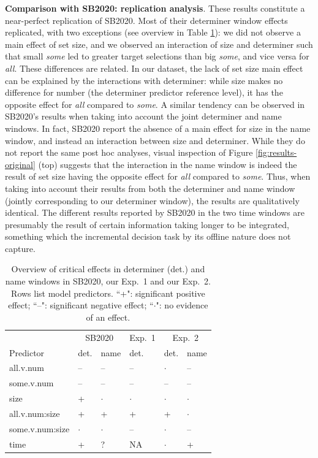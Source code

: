 \documentclass[10pt,letterpaper]{article}
\newcommand{\tableref}[1]{Table \ref{#1}}
\newcommand{\figref}[1]{Figure \ref{#1}}
\newcommand{\jd}[1]{\textcolor{Red}{\textbf{[jd: #1]}}}
\begin{document}
\textbf{Comparison with SB2020: replication analysis}. These results constitute a near-perfect replication of  SB2020. Most of their determiner window effects replicated, with two exceptions (see overview in \tableref{tab:replication}): we did not observe a main effect of set size, and we observed an interaction of size and determiner such that small \emph{some} led to greater target selections than big \emph{some}, and vice versa for \emph{all}. These differences are related. In our dataset, the lack of set size main effect can be explained by the interactions with determiner: while size makes no difference for number (the determiner predictor reference level), it has the opposite effect for \emph{all} compared to \emph{some}. A similar tendency can be observed in SB2020's results when taking into account the joint determiner and name windows. In fact,  SB2020 report the absence of a main effect for size in the name window, and instead an interaction between size and determiner. While they do not report the same post hoc analyses, visual inspection of \figref{fig:results-original} (top) suggests that the interaction in the name window is indeed the result of set size having the opposite effect for \emph{all} compared to \emph{some}. Thus, when taking into account their results from both the determiner and name window (jointly corresponding to our determiner window), the results are qualitatively identical. The different results reported by  SB2020 in the two time windows are presumably the result of certain information taking longer to be integrated, something which the incremental decision task by its offline nature does not capture. %

\begin{table}
\centering
\caption{Overview of critical effects in determiner (det.) and name windows in SB2020, our Exp.~1 and our Exp.~2. Rows list model predictors. ``+": significant positive effect;  ``--": significant negative effect; ``$\cdot$": no evidence of an effect.}
{\small
\begin{tabular}{l l l l l l }
\toprule
& \multicolumn{2}{c}{SB2020} & Exp.~1 & \multicolumn{2}{c}{Exp.~2}\\
Predictor & det. & name & det. & det. & name \\
\midrule
all.v.num & -- &  -- &  -- & $\cdot$ & -- \\
some.v.num & -- &  -- &  -- & -- & -- \\
size & + &  $\cdot$ & $\cdot$ & $\cdot$ & $\cdot$ \\
all.v.num:size & + &  + & + & + & $\cdot$ \\
some.v.num:size & $\cdot$ &  $\cdot$ & -- & $\cdot$ & -- \\
time & + &  ? & NA & $\cdot$ & + \\
\bottomrule
\end{tabular}
}
\label{tab:replication}
\end{table}
\end{document}
